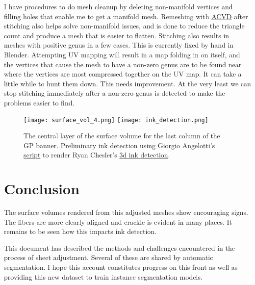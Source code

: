 \documentclass{article}
\begin{document}
I have procedures to do mesh cleanup by deleting non-manifold vertices and filling holes that enable me to get a manifold mesh. Remeshing with \href{https://github.com/valette/ACVD}{ACVD} after stitching also helps solve non-manifold issues, and is done to reduce the triangle count and produce a mesh that is easier to flatten. Stitching also results in meshes with positive genus in a few cases. This is currently fixed by hand in Blender. Attempting UV mapping will result in a map folding in on itself, and the vertices that cause the mesh to have a non-zero genus are to be found near where the vertices are most compressed together on the UV map. It can take a little while to hunt them down. This needs improvement. At the very least we can stop stitching immediately after a non-zero genus is detected to make the problems easier to find.

\begin{figure}
    \centering
    \texttt{[image: surface\_vol\_4.png]}
    \texttt{[image: ink\_detection.png]}
    \caption{The central layer of the surface volume for the last column of the GP banner. Preliminary ink detection using Giorgio Angelotti's \href{https://gist.github.com/giorgioangel/6ae26b126f364dda751a10be0b90b36d}{script} to render Ryan Chesler's \href{https://github.com/ryanchesler/3d-ink-detection}{3d ink detection}.}
    \label{render}
\end{figure}

\section{Conclusion}

The surface volumes rendered from this adjusted meshes show encouraging signs. The fibers are more clearly aligned and crackle is evident in many places. It remains to be seen how this impacts ink detection.

This document has described the methods and challenges encountered in the process of sheet adjustment. Several of these are shared by automatic segmentation. I hope this account constitutes progress on this front as well as providing this new dataset to train instance segmentation models.
\end{document}
